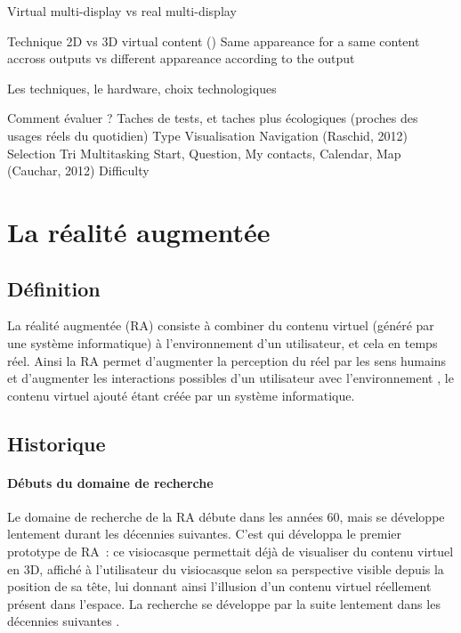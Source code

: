         Virtual multi-display vs real multi-display 

        Technique 
            2D vs 3D virtual content (\cite{SerranoHildebrandtSubramanianEtAl2014})
            Same appareance for a same content accross outputs vs different appareance according to the output \cite{GrubertHeinischQuigleyEtAl2015} 

Les techniques, le hardware, choix technologiques

Comment évaluer ? Taches de tests, et taches plus écologiques (proches des usages réels du quotidien) \cite{DuenserGrassetBillinghurst2008}
    Type
        Visualisation 
        Navigation \cite{EnsFinneganIrani2014} (Raschid, 2012) 
        Selection \cite{EnsFinneganIrani2014}
        Tri \cite{RobertsonCzerwinskiLarsonEtAl1998}
        Multitasking 
            Start, Question, My contacts, Calendar, Map (Cauchar, 2012) \cite{EnsFinneganIrani2014} 
    Difficulty



\section*{La réalité augmentée}
\subsection*{Définition}
La réalité augmentée (RA) consiste à combiner du contenu virtuel (généré par une système informatique) à l'environnement d'un utilisateur, et cela en temps réel. Ainsi la RA permet d'augmenter la perception du réel par les sens humains et d'augmenter les interactions possibles d'un utilisateur avec l'environnement \citep{Azuma1997}, le contenu virtuel ajouté étant créée par un système informatique.

\subsection*{Historique}
\paragraph*{Débuts du domaine de recherche}
Le domaine de recherche de la RA débute dans les années 60, mais se développe lentement durant les décennies suivantes. C'est \citet{Sutherland1968} qui développa le premier prototype de RA~: ce visiocasque permettait déjà de visualiser du contenu virtuel en 3D, affiché à l'utilisateur du visiocasque selon sa perspective visible depuis la position de sa tête, lui donnant ainsi l'illusion d'un contenu virtuel réellement présent dans l'espace. La recherche se développe par la suite lentement dans les décennies suivantes \citep{VanKrevelenPoelman2010} \citep{CarmignianiFurhtAnisettiEtAl2011}.


